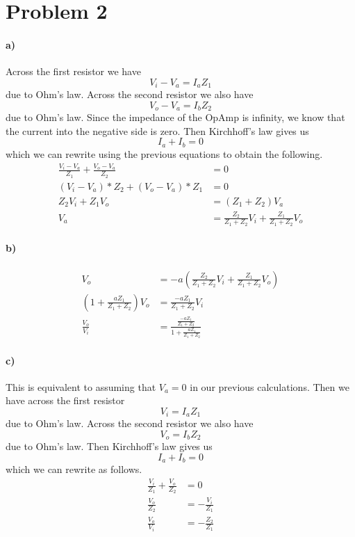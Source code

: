 \documentclass[12pt]{article}
\begin{document}
\section*{Problem 2}

\paragraph{a)}

Across the first resistor we have
\[V_i-V_a = I_aZ_1\]
due to Ohm's law. Across the second resistor we also have
\[V_o-V_a = I_bZ_2\]
due to Ohm's law. Since the impedance of the OpAmp is infinity, we know that the current into the negative side is zero.
Then Kirchhoff's law gives us
\[I_a + I_b = 0\]
which we can rewrite using the previous equations to obtain the following.
\begin{align*}
    \frac{V_i-V_a}{Z_1} + \frac{V_o-V_a}{Z_2} &= 0\\
    (V_i-V_a)*Z_2 + (V_o-V_a)*Z_1 &= 0\\
    Z_2V_i + Z_1V_o &= (Z_1+Z_2)V_a\\
    V_a &= \frac{Z_2}{Z_1+Z_2}V_i + \frac{Z_1}{Z_1+Z_2}V_o
\end{align*}

\paragraph{b)}

\begin{align*}
    V_o&=-a\left(\frac{Z_2}{Z_1+Z_2}V_i + \frac{Z_1}{Z_1+Z_2}V_o\right)\\
    \left(1+\frac{aZ_1}{Z_1+Z_2}\right)V_o&=\frac{-aZ_1}{Z_1+Z_2}V_i\\
    \frac{V_o}{V_i}&=\frac{\frac{-aZ_1}{Z_1+Z_2}}{1+\frac{aZ_1}{Z_1+Z_2}}
\end{align*}

\paragraph{c)}

This is equivalent to assuming that \(V_a=0\) in our previous calculations. Then we have across the first resistor
\[V_i = I_aZ_1\]
due to Ohm's law. Across the second resistor we also have
\[V_o = I_bZ_2\]
due to Ohm's law. Then Kirchhoff's law gives us
\[I_a + I_b = 0\]
which we can rewrite as follows.
\begin{align*}
    \frac{V_i}{Z_1} + \frac{V_o}{Z_2} &= 0\\
    \frac{V_o}{Z_2} &= -\frac{V_i}{Z_1}\\
    \frac{V_o}{V_i} &= -\frac{Z_2}{Z_1}
\end{align*}
\end{document}
